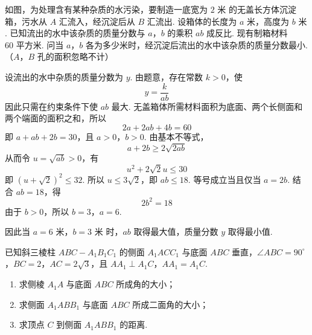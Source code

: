 \documentclass[UTF8,a4paper,oneside,11pt]{ctexbook}
\begin{document}
\begin{problem}
如图，为处理含有某种杂质的水污染，要制造一底宽为 \(2\text{ 米}\) 的无盖长方体沉淀箱，污水从 \(A\) 汇流入，经沉淀后从 \(B\) 汇流出. 设箱体的长度为 \(a\text{ 米}\)，高度为 \(b\text{ 米}\). 已知流出的水中该杂质的质量分数与 \(a\)，\(b\) 的乘积 \(ab\) 成反比. 现有制箱材料 \(60\text{ 平方米}\). 问当 \(a\)，\(b\) 各为多少米时，经沉淀后流出的水中该杂质的质量分数最小. （\(A\)，\(B\) 孔的面积忽略不计）

\end{problem}

\begin{solution}
设流出的水中杂质的质量分数为 \(y\). 由题意，存在常数 \(k>0\)，使
\[
y=\frac{k}{ab}
\]
因此只需在约束条件下使 \(ab\) 最大. 无盖箱体所需材料面积为底面、两个长侧面和两个端面的面积之和，所以
\[
2a+2ab+4b=60
\]
即 \(a+ab+2b=30\)，且 \(a>0\)，\(b>0\).
由基本不等式，
\[
a+2b\geq2\sqrt{2ab}
\]
从而令 \(u=\sqrt{ab}>0\)，有
\[
u^{2}+2\sqrt{2}u\leq30
\]
即 \((u+\sqrt{2})^{2}\leq32\).
所以 \(u\leq3\sqrt{2}\)，即 \(ab\leq18\). 等号成立当且仅当 \(a=2b\). 结合 \(ab=18\)，得
\[
2b^{2}=18
\]
由于 \(b>0\)，所以 \(b=3\)，\(a=6\).

因此当 \(a=6\text{ 米}\)，\(b=3\text{ 米}\) 时，\(ab\) 取得最大值，质量分数 \(y\) 取得最小值.
\end{solution}

\begin{problem}
已知斜三棱柱 \(ABC - A_{1}B_{1}C_{1}\) 的侧面 \(A_{1}ACC_{1}\) 与底面 \(ABC\) 垂直，\(\angle ABC = 90^{\circ}\)，\(BC = 2\)，\(AC = 2\sqrt{3}\)，且 \(AA_{1} \perp A_{1}C\)，\(AA_{1} = A_{1}C\).

\begin{enumerate}
\item 求侧棱 \(A_{1}A\) 与底面 \(ABC\) 所成角的大小；
\item 求侧面 \(A_{1}ABB_{1}\) 与底面 \(ABC\) 所成二面角的大小；
\item 求顶点 \(C\) 到侧面 \(A_{1}ABB_{1}\) 的距离.
\end{enumerate}

\end{problem}
\end{document}
